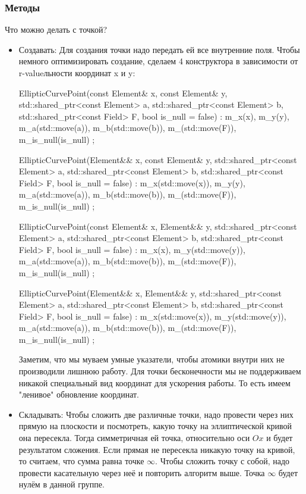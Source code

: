 \subsubsection{Методы}
Что можно делать с точкой?
\begin{itemize}
  \item Создавать:
  Для создания точки надо передать ей все внутренние поля. Чтобы немного оптимизировать создание, сделаем 4 конструктора в зависимости от r-valueльности координат x и y:
  \begin{cppcode}
EllipticCurvePoint(const Element& x, const Element& y, std::shared_ptr<const Element> a,
                   std::shared_ptr<const Element> b, std::shared_ptr<const Field> F,
                   bool is_null = false) :
    m_x(x), m_y(y), m_a(std::move(a)),
    m_b(std::move(b)), m_(std::move(F)), m_is_null(is_null) {};

    EllipticCurvePoint(Element&& x, const Element& y, std::shared_ptr<const Element> a,
                   std::shared_ptr<const Element> b, std::shared_ptr<const Field> F,
                   bool is_null = false) :
    m_x(std::move(x)), m_y(y), m_a(std::move(a)),
    m_b(std::move(b)), m_(std::move(F)), m_is_null(is_null) {};

    EllipticCurvePoint(const Element& x, Element&& y, std::shared_ptr<const Element> a,
                   std::shared_ptr<const Element> b, std::shared_ptr<const Field> F,
                   bool is_null = false) :
    m_x(x), m_y(std::move(y)), m_a(std::move(a)),
    m_b(std::move(b)), m_(std::move(F)), m_is_null(is_null) {};

    EllipticCurvePoint(Element&& x, Element&& y, std::shared_ptr<const Element> a,
                   std::shared_ptr<const Element> b, std::shared_ptr<const Field> F,
                   bool is_null = false) :
    m_x(std::move(x)), m_y(std::move(y)), m_a(std::move(a)),
    m_b(std::move(b)), m_(std::move(F)), m_is_null(is_null) {};
  \end{cppcode}
  Заметим, что мы муваем умные указатели, чтобы атомики внутри них не производили лишнюю работу. Для точки бесконечности мы не поддерживаем никакой специальный вид координат для ускорения работы. То есть имеем "ленивое" обновление координат.
  \item Складывать:
  Чтобы сложить две различные точки, надо провести через них прямую на плоскости и посмотреть, какую точку на эллиптической кривой она пересекла. Тогда симметричная ей точка, относительно оси $Ox$ и будет результатом сложения. Если прямая не пересекла никакую точку на кривой, то считаем, что сумма равна точке $\infty$. Чтобы сложить точку с собой, надо провести касательную через неё и повторить алгоритм выше. Точка $\infty$ будет нулём в данной группе.


\end{itemize}
